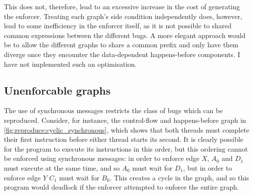 This does not, therefore, lead to an excessive increase in the cost of
generating the enforcer.  Treating each graph's side condition
independently does, however, lead to some inefficiency in the enforcer
itself, as it is not possible to shared common expressions between the
different bugs.  A more elegant approach would be to allow the
different graphs to share a common prefix and only have them diverge
once they encounter the data-dependent happens-before components.  I
have not implemented such an optimisation.

\subsection{Unenforcable graphs}
\begin{figure}
  \centerline{
    {\hfill}
    {\hfill}
    {\hfill}
  }
  \vspace{-12pt}
  \caption{}
  \label{fig:reproduce:cyclic1}
\end{figure}

The use of synchronous messages restricts the class of bugs which can
be reproduced.  Consider, for instance, the control-flow and
happens-before graph in \autoref{fig:reproduce:cyclic_synchronous},
which shows that both threads must complete their first instruction
before either thread starts its second.  It is clearly possible for
the program to execute its instructions in this order, but this
ordering cannot be enforced using synchronous messages: in order to
enforce edge $X$, $A_0$ and $D_1$ must execute at the same time, and
so $A_0$ must wait for $D_1$, but in order to enforce edge $Y$ $C_1$
must wait for $B_0$.  This creates a cycle in the graph, and so this
program would deadlock if the enforcer attempted to enforce the entire
graph.


